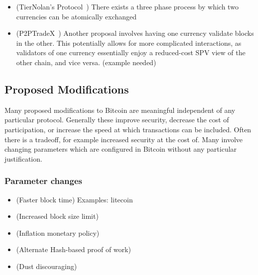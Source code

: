 \begin{itemize}
\item (TierNolan's Protocol~\cite{tiernolan}) There exists a three phase process by which two currencies can be atomically exchanged
\item (P2PTradeX~\cite{p2ptradex}) Another proposal involves having one currency validate blocks in the other. This potentially allows for more complicated interactions, as validators of one currency essentially enjoy a reduced-cost SPV view of the other chain, and vice versa. (example needed)
\end{itemize}

\subsection{Proposed Modifications}

Many proposed modifications to Bitcoin are meaningful independent of any particular protocol. Generally these improve security, decrease the cost of participation, or increase the speed at which transactions can be included. Often there is a tradeoff, for example increased security at the cost of. Many involve changing parameters which are configured in Bitcoin without any particular justification. 

\subsubsection{Parameter changes}
\begin{itemize}
\item (Faster block time) Examples: litecoin
\item (Increased block size limit)
\item (Inflation monetary policy)
\item (Alternate Hash-based proof of work)
\item (Dust discouraging)
\end{itemize}

